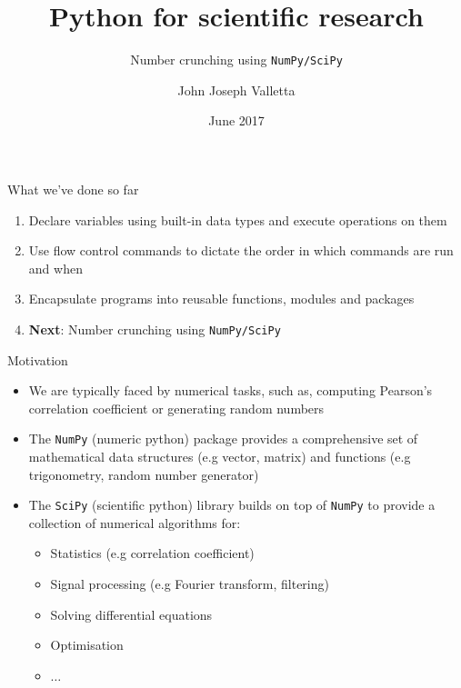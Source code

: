 \documentclass[pdf]{beamer}
\title[Python for scientific research]{Python for scientific research}
\subtitle{Number crunching using \texttt{NumPy/SciPy}}
\author{John Joseph Valletta}
\date[June 2017]{June 2017}
\institute[]{University of Exeter, Penryn Campus, UK}
\begin{document}
\begin{frame}
\titlepage
\end{frame}

\begin{frame}{What we've done so far}

	\begin{enumerate}\addtolength{\itemsep}{1\baselineskip}
		\item Declare variables using built-in data types and execute operations
		on them
		\item Use flow control commands to dictate the order in which commands are run
		and when
		\item Encapsulate programs into reusable functions, modules and packages
		\item \textbf{Next}: Number crunching using \texttt{NumPy/SciPy}
	\end{enumerate}

\end{frame}

\begin{frame}{Motivation}

\begin{itemize}\addtolength{\itemsep}{\baselineskip}
	\item<1-> We are typically faced by numerical tasks, 
	such as, computing Pearson's correlation coefficient
	or generating random numbers

	\item<2-> The \texttt{NumPy} (numeric python) package provides
	a comprehensive set of mathematical data structures (e.g vector, matrix)
	and functions (e.g trigonometry, random number generator) 

	\item<3-> The \texttt{SciPy} (scientific python) library builds on top
	of \texttt{NumPy} to provide a collection of numerical algorithms for: 
	\begin{itemize}
		\item<4-> Statistics (e.g correlation coefficient)
		\item<5-> Signal processing (e.g Fourier transform, filtering)
		\item<6-> Solving differential equations
		\item<7-> Optimisation
		\item<8-> $\ldots$
	\end{itemize}
\end{itemize}
\end{frame}
\end{document}
